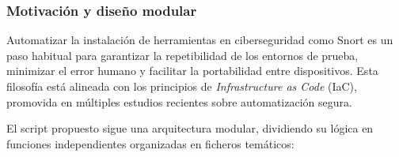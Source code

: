 \documentclass[11pt,a4paper,twoside]{report}
\begin{document}
\subsubsection{Motivación y diseño modular}

Automatizar la instalación de herramientas en ciberseguridad como Snort es un paso habitual para garantizar la repetibilidad de los entornos de prueba, minimizar el error humano y facilitar la portabilidad entre dispositivos. Esta filosofía está alineada con los principios de \textit{Infrastructure as Code} (IaC), promovida en múltiples estudios recientes sobre automatización segura.
\newline

El script propuesto sigue una arquitectura modular, dividiendo su lógica en funciones independientes organizadas en ficheros temáticos:
\end{document}
